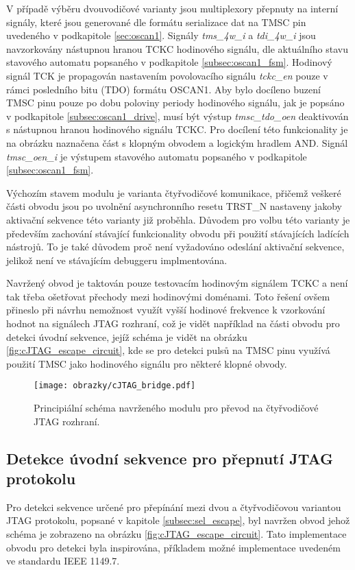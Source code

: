 V případě výběru dvouvodičové varianty jsou multiplexory přepnuty na interní signály, které jsou generované dle formátu serializace dat na TMSC pin uvedeného v podkapitole \ref{sec:oscan1}. Signály \textit{tms\_4w\_i} a \textit{tdi\_4w\_i} jsou navzorkovány nástupnou hranou TCKC hodinového signálu, dle aktuálního stavu stavového automatu popsaného v podkapitole \ref{subsec:oscan1_fsm}. Hodinový signál TCK je propagován nastavením povolovacího signálu \textit{tckc\_en} pouze v rámci posledního bitu (TDO) formátu OSCAN1. Aby bylo docíleno buzení TMSC pinu pouze po dobu poloviny periody hodinového signálu, jak je popsáno v podkapitole \ref{subsec:oscan1_drive}, musí být výstup \textit{tmsc\_tdo\_oen} deaktivován s nástupnou hranou hodinového signálu TCKC. Pro docílení této funkcionality je na obrázku naznačena část s klopným obvodem a logickým hradlem AND. Signál \textit{tmsc\_oen\_i} je výstupem stavového automatu popsaného v podkapitole \ref{subsec:oscan1_fsm}.

Výchozím stavem modulu je varianta čtyřvodičové komunikace, přičemž veškeré části obvodu jsou po uvolnění asynchronního resetu TRST\_N nastaveny jakoby aktivační sekvence této varianty již proběhla. Důvodem pro volbu této varianty je především zachování stávající funkcionality obvodu při použití stávajících ladících nástrojů. To je také důvodem proč není vyžadováno odeslání aktivační sekvence, jelikož není ve stávajícím debuggeru implmentována.

Navržený obvod je taktován pouze testovacím hodinovým signálem TCKC a není tak třeba ošetřovat přechody mezi hodinovými doménami. Toto řešení ovšem přineslo při návrhu nemožnost využít vyšší hodinové frekvence k vzorkování hodnot na signálech \acs{JTAG} rozhraní, což je vidět například na části obvodu pro detekci úvodní sekvence, jejíž schéma je vidět na obrázku \ref{fig:cJTAG_escape_circuit}, kde se pro detekci pulsů na TMSC pinu využívá použití TMSC jako hodinového signálu pro některé klopné obvody.

\begin{figure}[!h]
  \begin{center}
    \texttt{[image: obrazky/cJTAG\_bridge.pdf]}
  \end{center}
  \caption{Principiální schéma navrženého modulu pro převod na čtyřvodičové \acs{JTAG} rozhraní.}
	\label{fig:cJTAG_bridge}
\end{figure}

\subsection{Detekce úvodní sekvence pro přepnutí JTAG protokolu}	\label{subsec:sel_escape_det}
Pro detekci sekvence určené pro přepínání mezi dvou a čtyřvodičovou variantou \acs{JTAG} protokolu, popsané v kapitole \ref{subsec:sel_escape}, byl navržen obvod jehož schéma je zobrazeno na obrázku \ref{fig:cJTAG_escape_circuit}. Tato implementace obvodu pro detekci byla inspirována, příkladem možné implementace uvedeném ve standardu IEEE 1149.7.

